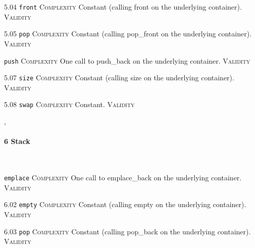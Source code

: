 \noindent\textcolor{cgreen}{5.04 \texttt{front}} \textsc{Complexity} Constant (calling front on the underlying container). \textsc{Validity} \vspace{0.5em}

\noindent\textcolor{cgreen}{5.05 \texttt{pop}} \textsc{Complexity} Constant (calling pop\_front on the underlying container). \textsc{Validity} \vspace{0.5em}

 \texttt{push} \textsc{Complexity} One call to push\_back on the underlying container. \textsc{Validity} \vspace{0.5em}

\noindent\textcolor{cgreen}{5.07 \texttt{size}} \textsc{Complexity} Constant (calling size on the underlying container). \textsc{Validity} \vspace{0.5em}

\noindent\textcolor{cgreen}{5.08 \texttt{swap}} \textsc{Complexity} Constant. \textsc{Validity} \vspace{0.5em}


\sep
{}
\paragraph{6 Stack}\mbox{}\\
 \texttt{emplace} \textsc{Complexity} One call to emplace\_back on the underlying container. \textsc{Validity} \vspace{0.5em}

\noindent\textcolor{cgreen}{6.02 \texttt{empty}} \textsc{Complexity} Constant (calling empty on the underlying container). \textsc{Validity} \vspace{0.5em}

\noindent\textcolor{cgreen}{6.03 \texttt{pop}} \textsc{Complexity} Constant (calling pop\_back on the underlying container). \textsc{Validity} \vspace{0.5em}

